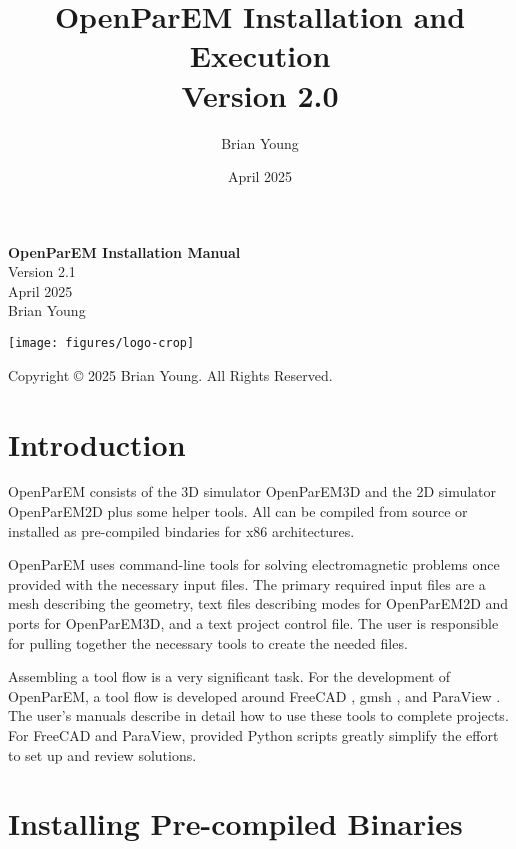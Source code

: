 \documentclass[titlepage]{article}
\title{OpenParEM Installation and Execution\\\large Version 2.0}
\date{April 2025}
\author{Brian Young}
\renewcommand\_{\textunderscore\linebreak[1]}
\begin{document}
\begin{titlepage}

   \centering
   \vspace*{3cm}
   {\huge\bfseries OpenParEM Installation Manual} \\
   \vskip1cm
   {\Large Version 2.1} \\
   \vskip1cm
   {\Large April 2025} \\
   \vskip1cm
   {\Large Brian Young} \\

   \vfill

   \texttt{[image: figures/logo-crop]}

   \vspace*{\fill}
   Copyright \copyright{} 2025 Brian Young. All Rights Reserved.
\end{titlepage}

\tableofcontents

\newpage
\section{Introduction}

OpenParEM consists of the 3D simulator OpenParEM3D and the 2D simulator OpenParEM2D plus some helper tools.  All can be compiled from source or installed as pre-compiled bindaries for x86 architectures.

OpenParEM uses command-line tools for solving electromagnetic problems once provided with the necessary input files.  The primary required input files are a mesh describing the geometry, text files describing modes for OpenParEM2D and ports for OpenParEM3D, and a text project control file.  The user is responsible for pulling together the necessary tools to create the needed files.

Assembling a tool flow is a very significant task.  For the development of OpenParEM, a tool flow is developed around FreeCAD \cite{freecad}, gmsh \cite{gmsh}\cite{gmshweb}, and ParaView \cite{paraview}.  The user's manuals describe in detail how to use these tools to complete projects.  For FreeCAD and ParaView, provided Python scripts greatly simplify the effort to set up and review solutions.

\section{Installing Pre-compiled Binaries}
\end{document}
